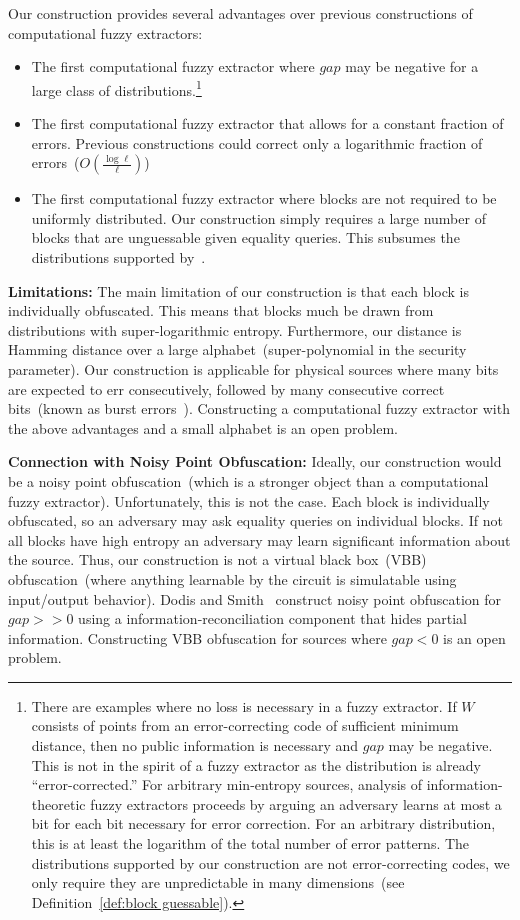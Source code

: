 \documentclass[11pt]{article}
\newcommand{\defref}[1]{\mbox{Definition~\ref{#1}}}
\begin{document}
Our construction provides several advantages over previous constructions of computational fuzzy extractors:
\begin{itemize}
\item The first computational fuzzy extractor where $gap$ may be negative for a large class of distributions.\footnote{There are examples where no loss is necessary in a fuzzy extractor.  If $W$ consists of points from an error-correcting code of sufficient minimum distance, then no public information is necessary and $gap$ may be negative.  This is not in the spirit of a fuzzy extractor as the distribution is already ``error-corrected.''  For arbitrary min-entropy sources, analysis of information-theoretic fuzzy extractors proceeds by arguing an adversary learns at most a bit for each bit necessary for error correction.   For an arbitrary distribution, this is at least the logarithm of the total number of error patterns.  The distributions supported by our construction are not error-correcting codes, we only require they are unpredictable in many dimensions~(see \defref{def:block guessable}).}
\item The first computational fuzzy extractor that allows for a constant fraction of errors.  Previous constructions could correct only  a logarithmic fraction of errors~($O(\frac{\log \ell}{\ell})$)
\item The first computational fuzzy extractor where blocks are not required to be uniformly distributed.  Our construction simply requires a large number of blocks that are unguessable given equality queries.  This subsumes the distributions supported by~\cite[Construction 4.1]{fuller2013computational}.
\end{itemize}

\textbf{Limitations: } The main limitation of our construction is that each block is individually obfuscated.  This means that blocks much be drawn from distributions with super-logarithmic entropy.  Furthermore, our distance is Hamming distance over a large alphabet~(super-polynomial in the security parameter).  Our construction is applicable for physical sources where many bits are expected to err consecutively, followed by many consecutive correct bits~(known as burst errors~\cite{gilbert1960capacity}).  Constructing a computational fuzzy extractor with the above advantages and a small alphabet is an open problem.


\textbf{Connection with Noisy Point Obfuscation: } Ideally, our construction would be a noisy point obfuscation~(which is a stronger object than a computational fuzzy extractor).  Unfortunately, this is not the case.  Each block is individually obfuscated, so an adversary may ask equality queries on individual blocks.  If not all blocks have high entropy an adversary may learn significant information about the source.  Thus, our construction is not a virtual black box~(VBB) obfuscation~(where anything learnable by the circuit is simulatable using input/output behavior).  Dodis and Smith~\cite{DBLP:conf/stoc/DodisS05} construct noisy point obfuscation for $gap>>0$ using a information-reconciliation component that hides partial information.  Constructing VBB obfuscation for sources where $gap <0$ is an open problem.
\end{document}
